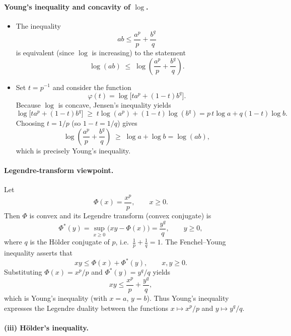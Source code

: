 \documentclass[12pt,a4paper]{article}
\theoremstyle{plain}
\theoremstyle{definition}
\theoremstyle{remark}
\theoremstyle{remark}
\begin{document}
\paragraph*{Young's inequality and concavity of $\log$.}

\begin{itemize}
	\item The inequality
	\[
	ab \le \frac{a^p}{p} + \frac{b^q}{q}
	\]
	is equivalent (since $\log$ is increasing) to the statement
	\[
	\log(ab) \;\le\;
	\log\!\left(\frac{a^p}{p} + \frac{b^q}{q}\right).
	\]
	
	\item Set $t = p^{-1}$ and consider the function
	\[
	\varphi(t) = \log\bigl[t a^p + (1-t)b^q\bigr].
	\]
	Because $\log$ is concave, Jensen's inequality yields
	\[
	\log\bigl[t a^p + (1-t)b^q\bigr]
	\;\ge\; t\log(a^p) + (1-t)\log(b^q)
	= p\,t\log a + q(1-t)\log b.
	\]
	Choosing $t=1/p$ (so $1-t=1/q$) gives
	\[
	\log\!\left(\frac{a^p}{p} + \frac{b^q}{q}\right)
	\;\ge\; \log a + \log b = \log(ab),
	\]
	which is precisely Young's inequality.
\end{itemize}

\paragraph*{Legendre-transform viewpoint.}

Let
\[
\Phi(x) = \frac{x^p}{p}, \qquad x\ge 0.
\]
Then $\Phi$ is convex and its Legendre transform (convex conjugate) is
\[
\Phi^*(y)
= \sup_{x\ge0}\bigl(xy - \Phi(x)\bigr)
= \frac{y^q}{q}, \qquad y\ge0,
\]
where $q$ is the Hölder conjugate of $p$, i.e.\ $\frac1p+\frac1q=1$.
The Fenchel--Young inequality asserts that
\[
xy \le \Phi(x) + \Phi^*(y), \qquad x,y\ge0.
\]
Substituting $\Phi(x)=x^p/p$ and $\Phi^*(y)=y^q/q$ yields
\[
xy \le \frac{x^p}{p} + \frac{y^q}{q},
\]
which is Young's inequality (with $x=a$, $y=b$).  Thus Young's
inequality expresses the Legendre duality between the functions
$x\mapsto x^p/p$ and $y\mapsto y^q/q$.


\bigskip

\paragraph*{(iii) Hölder's inequality.}
\end{document}
